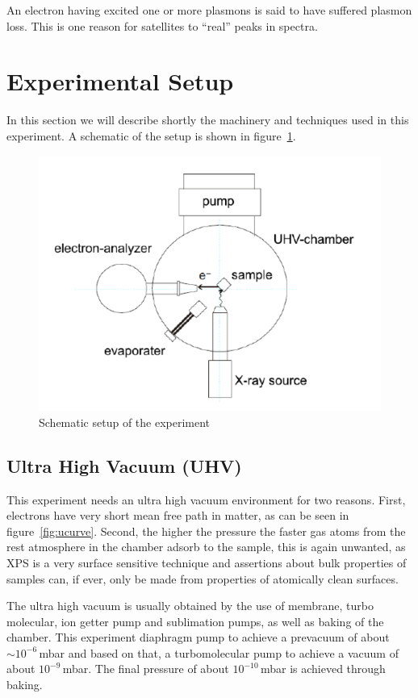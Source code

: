 \documentclass[a4paper,10pt]{scrartcl}
\begin{document}
An electron having excited one or more plasmons is said to have suffered plasmon loss. This is one reason for satellites to ``real'' peaks in spectra.

\section{Experimental Setup}

In this section we will describe shortly the machinery and techniques used in this experiment. A schematic of the setup is shown in figure~\ref{fig:setup}.

\begin{figure}
\centering
\includegraphics[scale=0.4]{img/setup}
\caption{Schematic setup of the experiment \label{fig:setup}}
\end{figure}


\subsection{Ultra High Vacuum (UHV)}

This experiment needs an ultra high vacuum environment for two reasons. First, electrons have very short mean free path in matter, as can be seen in figure~\ref{fig:ucurve}. Second, the higher the pressure the faster gas atoms from the rest atmosphere in the chamber adsorb to the sample, this is again unwanted, as XPS is a very surface sensitive technique and assertions about bulk properties of samples can, if ever, only be made from properties of atomically clean surfaces.

The ultra high vacuum is usually obtained by the use of membrane, turbo molecular, ion getter pump and sublimation pumps, as well as baking of the chamber. This experiment diaphragm pump to achieve a prevacuum of about $\sim 10^{-6}\,$mbar and based on that, a turbomolecular pump to achieve a vacuum of about $10^{-9}\,$mbar. The final pressure of about $10^{-10}\,$mbar is achieved through baking.
\end{document}
